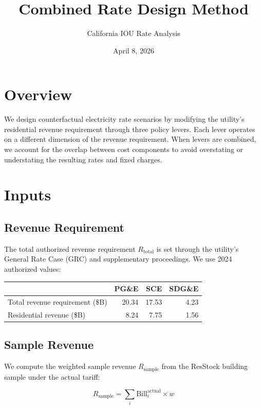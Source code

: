 \documentclass[11pt]{article}
\title{Combined Rate Design Method}
\author{California IOU Rate Analysis}
\date{April 8, 2026}
\begin{document}
\maketitle

\section{Overview}

We design counterfactual electricity rate scenarios by modifying the utility's residential revenue requirement through three policy levers. Each lever operates on a different dimension of the revenue requirement. When levers are combined, we account for the overlap between cost components to avoid overstating or understating the resulting rates and fixed charges.

\section{Inputs}

\subsection{Revenue Requirement}

The total authorized revenue requirement $R_{\text{total}}$ is set through the utility's General Rate Case (GRC) and supplementary proceedings. We use 2024 authorized values:

\begin{table}[htbp]
\centering
\begin{tabular}{l r r r}
\toprule
& \textbf{PG\&E} & \textbf{SCE} & \textbf{SDG\&E} \\
\midrule
Total revenue requirement (\$B) & 20.34 & 17.53 & 4.23 \\
Residential revenue (\$B) & 8.24 & 7.75 & 1.56 \\
\bottomrule
\end{tabular}
\end{table}

\subsection{Sample Revenue}

We compute the weighted sample revenue $R_{\text{sample}}$ from the ResStock building sample under the actual tariff:

\begin{equation}
R_{\text{sample}} = \sum_i \text{Bill}_i^{\text{actual}} \times w
\end{equation}
\end{document}
